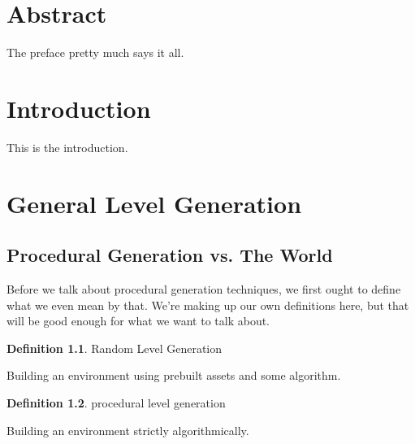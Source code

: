 \documentclass[12pt,twoside]{reedthesis}
\begin{document}
    \tableofcontents
    \listoftables
    \listoffigures

    \chapter*{Abstract}
	The preface pretty much says it all.

  \mainmatter %
  \pagestyle{fancyplain} %


    \chapter*{Introduction}

	
	This is the introduction.
	
\chapter{General Level Generation}
\section{Procedural Generation vs. The World}
Before we talk about procedural generation techniques, we first ought to define what we even mean by that. We're making up our own definitions here, but that will be good enough for what we want to talk about.
\theoremstyle{definition}
\newtheorem{definition}{Definition}[section]
\begin{definition}{Random Level Generation}

Building an environment using prebuilt assets and some algorithm.
\end{definition}
\begin{definition}{procedural level generation}

Building an environment strictly algorithmically.
\end{definition}
 
\end{document}
